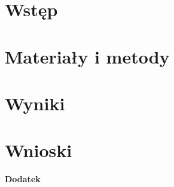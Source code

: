 \documentclass[12pt, a4paper]{article}
\begin{document}

\newpage
\thispagestyle{empty}


\newpage
\thispagestyle{empty}
\tableofcontents

\newpage
\thispagestyle{empty}
\printglossary[type=\acronymtype, title={Wykaz skrótów}]

\newpage


\newpage
\section{Wstęp}\label{sec:wstep}


\section{Materiały i metody}\label{sec:metody}


\section{Wyniki}\label{sec:wyniki}


\section{Wnioski}\label{sec:wnioski}





\newpage

\Large\textbf{Dodatek}\label{dodatek}

\end{document}

